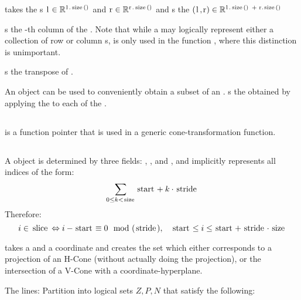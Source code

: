  takes the s $\mli{l} \in \R^{\mli{l.size()}}$ and $\mli{r} \in \R^{\mli{r.size()}}$ and s the  $(\mli{l,r}) \in \R^{\mli{l.size() + r.size()}}$
\lstconcatenate

 s the -th column of the .  Note that while a  may logically represent either a collection of row or column s,  is only used in the function , where this distinction is unimportant.
\lstgetcolumn

 s the transpose of .
\lsttranspose

An  object can be used to conveniently obtain a subset of an .   s the  obtained by applying the  to each  of the .
\lstslicematrix

\subsection{}

 is a function pointer  that is used in a generic cone-transformation function.
\lstLift

\subsection{}

A  object is determined by three fields: , , and , and implicitly represents all indices of the form:
\[ \sum_{0 \leq k < \mli{size}} \mli{start} + k\cdot\mli{stride} \]
Therefore:
\[ i \in \mli{slice} \Leftrightarrow i - \mli{start} \equiv 0 \mod(\mli{stride}),
                           \quad \mli{start} \leq i \leq \mli{start} + {\mli{stride}}\cdot\mli{size} \]
\lstindexinslice

 takes a  and a coordinate  and creates the set which either corresponds to a projection of an H-Cone (without actually doing the projection), or the intersection of a V-Cone with a coordinate-hyperplane.
\lstfouriermotzkin

The lines:
\lstFMEPart
Partition  into logical sets $Z,P,N$ that satisfy the following:\\

